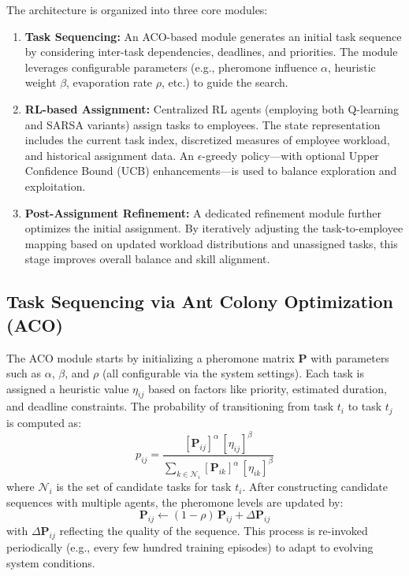 \documentclass[%
aip,
cp,  %
amsmath,amssymb,
reprint,%
]{revtex4-2}
\begin{document}
	The architecture is organized into three core modules:
	\begin{enumerate}
		\item \textbf{Task Sequencing:} An ACO-based module generates an initial task sequence by considering inter-task dependencies, deadlines, and priorities. The module leverages configurable parameters (e.g., pheromone influence $\alpha$, heuristic weight $\beta$, evaporation rate $\rho$, etc.) to guide the search.
		\item \textbf{RL-based Assignment:} Centralized RL agents (employing both Q-learning and SARSA variants) assign tasks to employees. The state representation includes the current task index, discretized measures of employee workload, and historical assignment data. An $\epsilon$-greedy policy—with optional Upper Confidence Bound (UCB) enhancements—is used to balance exploration and exploitation.
		\item \textbf{Post-Assignment Refinement:} A dedicated refinement module further optimizes the initial assignment. By iteratively adjusting the task-to-employee mapping based on updated workload distributions and unassigned tasks, this stage improves overall balance and skill alignment.
	\end{enumerate}
	
	\subsection{\label{subsec:task-seq}Task Sequencing via Ant Colony Optimization (ACO)}
	
	The ACO module starts by initializing a pheromone matrix $\mathbf{P}$ with parameters such as $\alpha$, $\beta$, and $\rho$ (all configurable via the system settings). Each task is assigned a heuristic value $\eta_{ij}$ based on factors like priority, estimated duration, and deadline constraints. The probability of transitioning from task $t_i$ to task $t_j$ is computed as:
	\begin{equation}
		p_{ij} = \frac{[\mathbf{P}_{ij}]^{\alpha} \,[\eta_{ij}]^{\beta}}{\sum_{k \in \mathcal{N}_i}[\mathbf{P}_{ik}]^{\alpha} \,[\eta_{ik}]^{\beta}}
	\end{equation}
	where $\mathcal{N}_i$ is the set of candidate tasks for task $t_i$. After constructing candidate sequences with multiple agents, the pheromone levels are updated by:
	\begin{equation}
		\mathbf{P}_{ij} \leftarrow (1 - \rho)\,\mathbf{P}_{ij} + \Delta \mathbf{P}_{ij}
	\end{equation}
	with $\Delta \mathbf{P}_{ij}$ reflecting the quality of the sequence. This process is re-invoked periodically (e.g., every few hundred training episodes) to adapt to evolving system conditions.
	
\end{document}
